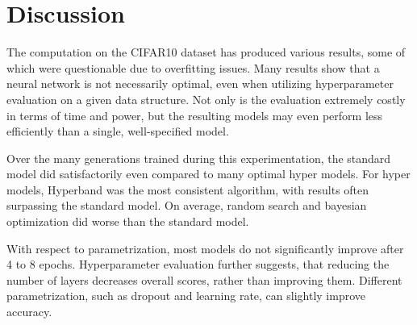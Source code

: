 \chapter{Discussion}
The computation on the CIFAR10 dataset has produced various results, some of which were questionable due to overfitting issues. 
Many results show that a neural network is not necessarily optimal, even when utilizing hyperparameter evaluation on a given data structure. 
Not only is the evaluation extremely costly in terms of time and power, but the resulting models may even perform less efficiently than a single, well-specified model. 

Over the many generations trained during this experimentation, the standard model did satisfactorily even compared to many optimal hyper models.
For hyper models, Hyperband was the most consistent algorithm, with results often surpassing the standard model.
On average, random search and bayesian optimization did worse than the standard model.

With respect to parametrization, most models do not significantly improve after 4 to 8 epochs. 
Hyperparameter evaluation further suggests, that reducing the number of layers decreases overall scores, rather than improving them.
Different parametrization, such as dropout and learning rate, can slightly improve accuracy.